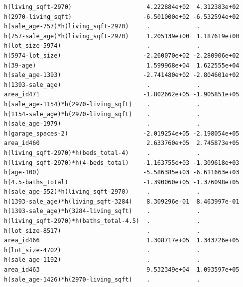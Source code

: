 \documentclass[
]{article}
\begin{document}
\begin{verbatim}
h(living_sqft-2970)                     4.222884e+02  4.312383e+02
h(2970-living_sqft)                    -6.501000e+02 -6.532594e+02
h(sale_age-757)*h(living_sqft-2970)     .             .           
h(757-sale_age)*h(living_sqft-2970)     1.205139e+00  1.187619e+00
h(lot_size-5974)                        .             .           
h(5974-lot_size)                       -2.260070e+02 -2.280906e+02
h(39-age)                               1.599968e+04  1.622555e+04
h(sale_age-1393)                       -2.741480e+02 -2.804601e+02
h(1393-sale_age)                        .             .           
area_id471                             -1.802662e+05 -1.905851e+05
h(sale_age-1154)*h(2970-living_sqft)    .             .           
h(1154-sale_age)*h(2970-living_sqft)    .             .           
h(sale_age-1979)                        .             .           
h(garage_spaces-2)                     -2.019254e+05 -2.198054e+05
area_id460                              2.633760e+05  2.745873e+05
h(living_sqft-2970)*h(beds_total-4)     .             .           
h(living_sqft-2970)*h(4-beds_total)    -1.163755e+03 -1.309618e+03
h(age-100)                             -5.586385e+03 -6.611663e+03
h(4.5-baths_total)                     -1.390060e+05 -1.376098e+05
h(sale_age-552)*h(living_sqft-2970)     .             .           
h(1393-sale_age)*h(living_sqft-3284)    8.309296e-01  8.463997e-01
h(1393-sale_age)*h(3284-living_sqft)    .             .           
h(living_sqft-2970)*h(baths_total-4.5)  .             .           
h(lot_size-8517)                        .             .           
area_id466                              1.308717e+05  1.343726e+05
h(lot_size-4702)                        .             .           
h(sale_age-1192)                        .             .           
area_id463                              9.532349e+04  1.093597e+05
h(sale_age-1426)*h(2970-living_sqft)    .             .           
                                                                  

\end{verbatim}
\end{document}
